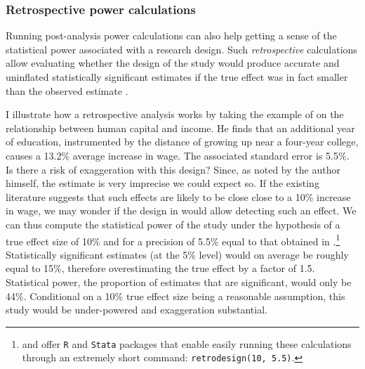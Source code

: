 \documentclass[usletter, 12pt]{article}
\begin{document}
				
			\subsubsection{Retrospective power calculations}
			
				Running post-analysis power calculations can also help getting a sense of the statistical power associated with a research design. Such \textit{retrospective} calculations allow evaluating whether the design of the study would produce accurate and uninflated statistically significant estimates if the true effect was in fact smaller than the observed estimate \citep{gelman_beyond_2014, ioannidis_power_2017, stommes_reliability_2021}. 
				
				I illustrate how a retrospective analysis works by taking the example of \cite{card_using_1993} on the relationship between human capital and income. He finds that an additional year of education, instrumented by the distance of growing up near a four-year college, causes a 13.2\% average increase in wage. The associated standard error is 5.5\%. Is there a risk of exaggeration with this design? Since, as noted by the author himself, the estimate is very imprecise we could expect so. If the existing literature suggests that such effects are likely to be close close to a 10\% increase in wage, we may wonder if the design in \cite{card_using_1993} would allow detecting such an effect. We can thus compute the statistical power of the study under the hypothesis of a true effect size of 10\% and for a precision of 5.5\% equal to that obtained in \cite{card_using_1993}.\footnote{\cite{timm_retrodesign_2019} and \cite{linden_retrodesign_2019} offer \texttt{R} and \texttt{Stata} packages that enable easily running these calculations through an extremely short command: \texttt{retrodesign(10, 5.5)}.} Statistically significant estimates (at the 5\% level) would on average be roughly equal to 15\%, therefore overestimating the true effect by a factor of 1.5. Statistical power, the proportion of estimates that are significant, would only be 44\%. Conditional on a 10\% true effect size being a reasonable assumption, this study would be under-powered and exaggeration substantial.
			
\end{document}
